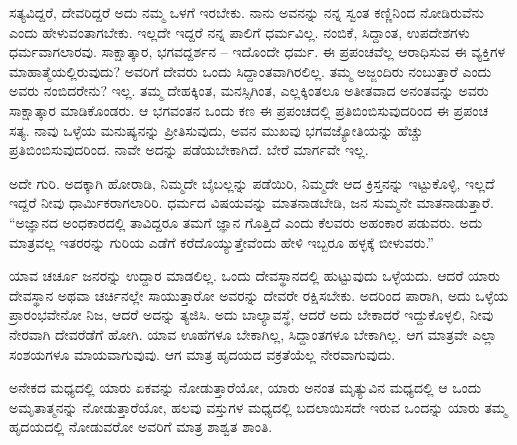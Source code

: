 ಸತ್ಯವಿದ್ದರೆ, ದೇವರಿದ್ದರೆ ಅದು ನಮ್ಮ ಒಳಗೆ ಇರಬೇಕು. ನಾನು ಅವನನ್ನು ನನ್ನ ಸ್ವಂತ ಕಣ್ಣಿನಿಂದ ನೋಡಿರುವೆನು ಎಂದು ಹೇಳುವಂತಾಗಬೇಕು. ಇಲ್ಲದೇ ಇದ್ದರೆ ನನ್ನ ಪಾಲಿಗೆ ಧರ್ಮವಿಲ್ಲ. ನಂಬಿಕೆ, ಸಿದ್ದಾಂತ, ಉಪದೇಶಗಳು ಧರ್ಮವಾಗಲಾರವು. ಸಾಕ್ಷಾತ್ಕಾರ, ಭಗವದ್ದರ್ಶನ – ಇದೊಂದೇ ಧರ್ಮ. ಈ ಪ್ರಪಂಚವೆಲ್ಲ ಆರಾಧಿಸುವ ಈ ವ್ಯಕ್ತಿಗಳ ಮಾಹಾತ್ಮೆಯಲ್ಲಿರುವುದು? ಅವರಿಗೆ ದೇವರು ಒಂದು ಸಿದ್ದಾಂತವಾಗಿರಲಿಲ್ಲ. ತಮ್ಮ ಅಜ್ಜಂದಿರು ನಂಬುತ್ತಾರೆ ಎಂದು ಅವರು ನಂಬಿದರೇನು? ಇಲ್ಲ. ತಮ್ಮ ದೇಹಕ್ಕಿಂತ, ಮನಸ್ಸಿಗಿಂತ, ಎಲ್ಲಕ್ಕಿಂತಲೂ ಅತೀತವಾದ ಅನಂತವನ್ನು ಅವರು ಸಾಕ್ಷಾತ್ಕಾರ ಮಾಡಿಕೊಂಡರು. ಆ ಭಗವಂತನ ಒಂದು ಕಣ ಈ ಪ್ರಪಂಚದಲ್ಲಿ ಪ್ರತಿಬಿಂಬಿಸುವುದರಿಂದ ಈ ಪ್ರಪಂಚ ಸತ್ಯ. ನಾವು ಒಳ್ಳೆಯ ಮನುಷ್ಯನನ್ನು ಪ್ರೀತಿಸುವುದು, ಅವನ ಮುಖವು ಭಗವಜ್ಯೋತಿಯನ್ನು ಹೆಚ್ಚು ಪ್ರತಿಬಿಂಬಿಸುವುದರಿಂದ. ನಾವೇ ಅದನ್ನು ಪಡೆಯಬೇಕಾಗಿದೆ. ಬೇರೆ ಮಾರ್ಗವೇ ಇಲ್ಲ.

ಅದೇ ಗುರಿ. ಅದಕ್ಕಾಗಿ ಹೋರಾಡಿ, ನಿಮ್ಮದೇ ಬೈಬಲ್ಲನ್ನು ಪಡೆಯಿರಿ, ನಿಮ್ಮದೇ ಆದ ಕ್ರಿಸ್ತನನ್ನು ಇಟ್ಟುಕೊಳ್ಳಿ, ಇಲ್ಲದೆ ಇದ್ದರೆ ನೀವು ಧಾರ್ಮಿಕರಾಗಲಾರಿರಿ. ಧರ್ಮದ ವಿಷಯವನ್ನು ಮಾತನಾಡಬೇಡಿ, ಜನ ಸುಮ್ಮನೇ ಮಾತನಾಡುತ್ತಾರೆ. “ಅಜ್ಞಾನದ ಅಂಧಕಾರದಲ್ಲಿ ತಾವಿದ್ದರೂ ತಮಗೆ ಜ್ಞಾನ ಗೊತ್ತಿದೆ ಎಂದು ಕೆಲವರು ಅಹಂಕಾರ ಪಡುವರು. ಅದು ಮಾತ್ರವಲ್ಲ ಇತರರನ್ನು ಗುರಿಯ ಎಡೆಗೆ ಕರೆದೊಯ್ಯುತ್ತೇವೆಂದು ಹೇಳಿ ಇಬ್ಬರೂ ಹಳ್ಳಕ್ಕೆ ಬೀಳುವರು.”

ಯಾವ ಚರ್ಚೂ ಜನರನ್ನು ಉದ್ದಾರ ಮಾಡಲಿಲ್ಲ. ಒಂದು ದೇವಸ್ಥಾನದಲ್ಲಿ ಹುಟ್ಟುವುದು ಒಳ್ಳೆಯದು. ಆದರೆ ಯಾರು ದೇವಸ್ಥಾನ ಅಥವಾ ಚರ್ಚಿನಲ್ಲೇ ಸಾಯುತ್ತಾರೋ ಅವರನ್ನು ದೇವರೇ ರಕ್ಷಿಸಬೇಕು. ಅದರಿಂದ ಪಾರಾಗಿ, ಅದು ಒಳ್ಳೆಯ ಪ್ರಾರಂಭವೇನೋ ನಿಜ, ಆದರೆ ಅದನ್ನು ತ್ಯಜಿಸಿ. ಅದು ಬಾಲ್ಯಾವಸ್ಥೆ, ಆದರೆ ಅದು ಬೇಕಾದರೆ ಇದ್ದುಕೊಳ್ಳಲಿ, ನೀವು ನೇರವಾಗಿ ದೇವರೆಡೆಗೆ ಹೋಗಿ. ಯಾವ ಊಹೆಗಳೂ ಬೇಕಾಗಿಲ್ಲ, ಸಿದ್ದಾಂತಗಳೂ ಬೇಕಾಗಿಲ್ಲ. ಆಗ ಮಾತ್ರವೇ ಎಲ್ಲಾ ಸಂಶಯಗಳೂ ಮಾಯವಾಗುವುವು. ಆಗ ಮಾತ್ರ ಹೃದಯದ ವಕ್ರತೆಯೆಲ್ಲ ನೇರವಾಗುವುದು.

\newpage

ಅನೇಕದ ಮಧ್ಯದಲ್ಲಿ ಯಾರು ಏಕವನ್ನು ನೋಡುತ್ತಾರೆಯೋ, ಯಾರು ಅನಂತ ಮೃತ್ಯುವಿನ ಮಧ್ಯದಲ್ಲಿ ಆ ಒಂದು ಅಮೃತಾತ್ಮನನ್ನು ನೋಡುತ್ತಾರೆಯೋ, ಹಲವು ವಸ್ತುಗಳ ಮಧ್ಯದಲ್ಲಿ ಬದಲಾಯಿಸದೇ ಇರುವ ಒಂದನ್ನು ಯಾರು ತಮ್ಮ ಹೃದಯದಲ್ಲಿ ನೋಡುವರೋ ಅವರಿಗೆ ಮಾತ್ರ ಶಾಶ್ವತ ಶಾಂತಿ.

